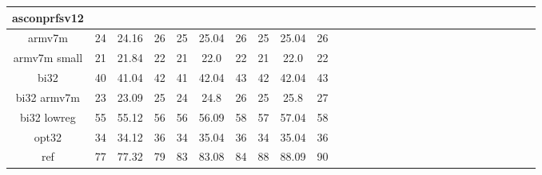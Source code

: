 \begin{landscape}
\begin{table}[]
\begin{adjustbox}{width=600pt}
\begin{tabular}{|c|c|c|c|c|c|c|c|c|c|c|c|c|c|c|c|c|c|c|c|c|c|c|c|c|c|c|c|}
				\hline
                asconprfsv12 & & & & & & & & & & & & & & & & & & & & & & & & & & & \\
				\hline
				armv7m & 24 & 24.16 & 26 & 25 & 25.04 & 26 & 25 & 25.04 & 26 & & & & & & & & & & & & & & & & & & \\
				\hline
				armv7m small & 21 & 21.84 & 22 & 21 & 22.0 & 22 & 21 & 22.0 & 22 & & & & & & & & & & & & & & & & & & \\
				\hline
				bi32 & 40 & 41.04 & 42 & 41 & 42.04 & 43 & 42 & 42.04 & 43 & & & & & & & & & & & & & & & & & & \\
				\hline
				bi32 armv7m & 23 & 23.09 & 25 & 24 & 24.8 & 26 & 25 & 25.8 & 27 & & & & & & & & & & & & & & & & & & \\
				\hline
				bi32 lowreg & 55 & 55.12 & 56 & 56 & 56.09 & 58 & 57 & 57.04 & 58 & & & & & & & & & & & & & & & & & & \\
				\hline
				opt32 & 34 & 34.12 & 36 & 34 & 35.04 & 36 & 34 & 35.04 & 36 & & & & & & & & & & & & & & & & & & \\
				\hline
				ref & 77 & 77.32 & 79 & 83 & 83.08 & 84 & 88 & 88.09 & 90 & & & & & & & & & & & & & & & & & & \\
				\hline
			\end{tabular}
		\end{adjustbox}
	\end{table}
\end{landscape}

